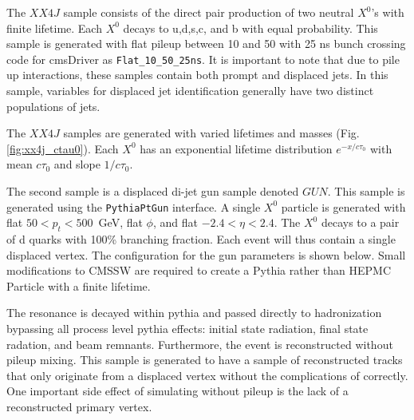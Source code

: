 The $XX4J$ sample consists of the direct pair production of two neutral $X^{0}$'s with finite lifetime.  
Each $X^{0}$ decays to u,d,s,c, and b with equal probability. This
sample is generated with flat pileup between 10 and 50 with 25 ns bunch crossing code for cmsDriver as
  \texttt{Flat\_10\_50\_25ns}. It is important
to note that due to pile up interactions, these samples contain both prompt and displaced jets. 
In this sample, variables for displaced jet identification generally have two distinct populations of jets. 

The $XX4J$ samples are generated with varied lifetimes and masses (Fig. \ref{fig:xx4j_ctau0}). Each $X^0$ has an
 exponential lifetime distribution $e^{-x / c\tau_0}$ with mean $c\tau_0$ and slope $1/c\tau_0$. 

The second sample is a displaced di-jet gun sample denoted $GUN$. This sample is generated using the \texttt{PythiaPtGun} interface. A single $X^0$ 
particle is generated with flat $50 < p_{t} < 500$~GeV, flat $\phi$, and flat $-2.4< \eta < 2.4$. The $X^{0}$ decays to a pair of 
d quarks with 100\% branching fraction. Each event will thus contain a single displaced vertex. 
The configuration for the gun parameters is shown below. Small modifications to CMSSW are required to create a Pythia rather than HEPMC Particle
with a finite lifetime. 


The resonance is decayed within pythia and passed directly to hadronization bypassing all process level pythia effects: initial
state radiation, final state radation, and beam remnants. Furthermore, the event is reconstructed without pileup mixing. This sample
is generated to have a sample of reconstructed tracks that only originate from a displaced vertex without the complications
of correctly. One important side effect of simulating without pileup is the lack of a reconstructed primary vertex. 

